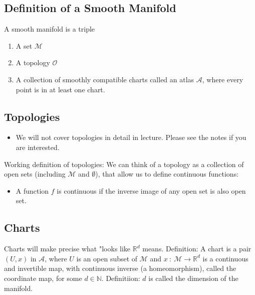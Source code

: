 \documentclass[10pt]{article}
\begin{document}
\subsection*{Definition of a Smooth Manifold}
A smooth manifold is a triple
\begin{enumerate}
    \item A set $\mathcal{M}$
    \item A topology $\mathcal{O}$
    \item A collection of smoothly compatible charts called an atlas $\mathcal{A}$, where every point is in at least one chart.
\end{enumerate}

\subsection*{Topologies}
\begin{itemize}
    \item We will not cover topologies in detail in lecture.  Please see the notes if you are interested.
\end{itemize}
Working definition of topologies:  We can think of a topology as a collection of open sets (including $\mathcal{M}$ and $\emptyset$), that allow us to define continuous functions:
\begin{itemize}
    \item A function $f$ is continuous if the inverse image of any open set is also open set.
\end{itemize}

\subsection*{Charts}
Charts will make precise what "looks like $\mathbb{R}^d$ means.
Definition: A chart is a pair $(U, x)$ in $\mathcal{A}$, where $U$ is an open subset of $\mathcal{M}$ and $x \::\: \mathcal{M} \rightarrow \mathbb{R}^d$ is a continuous and invertible map, with continuous inverse (a homeomorphism), called the coordinate map, for some $d \in \mathbb{N}$.
Definitiion: $d$ is called the dimension of the manifold.
\end{document}
